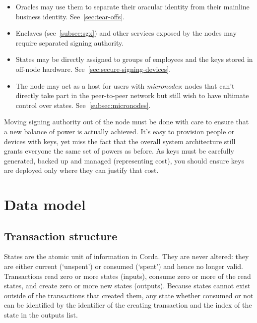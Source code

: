 \documentclass{article}
\begin{document}
\begin{itemize}
    \item Oracles may use them to separate their oracular identity from their mainline business identity.
          See~\cref{sec:tear-offs}.
    \item Enclaves (see~\cref{subsec:sgx}) and other services exposed by the nodes may require separated
          signing authority.
    \item States may be directly assigned to groups of employees and the keys stored in off-node hardware.
          See~\cref{sec:secure-signing-devices}.
    \item The node may act as a host for users with \emph{micronodes}: nodes that can't directly take part
          in the peer-to-peer network but still wish to have ultimate control over states. See~\cref{subsec:micronodes}.
\end{itemize}

Moving signing authority out of the node must be done with care to ensure that a new balance of power is
actually achieved. It's easy to provision people or devices with keys, yet miss the fact that the overall system
architecture still grants everyone the same set of powers as before. As keys must be carefully generated, backed up
and managed (representing cost), you should ensure keys are deployed only where they can justify that cost.


\section{Data model}

\subsection{Transaction structure}\label{subsec:transaction-structure}

States are the atomic unit of information in Corda. They are never altered: they are either current (`unspent') or
consumed (`spent') and hence no longer valid.  Transactions read zero or more states (inputs), consume zero or more
of the read states, and create zero or more new states (outputs). Because states cannot exist outside of the
transactions that created them, any state whether consumed or not can be identified by the identifier of the
creating transaction and the index of the state in the outputs list.
\end{document}
